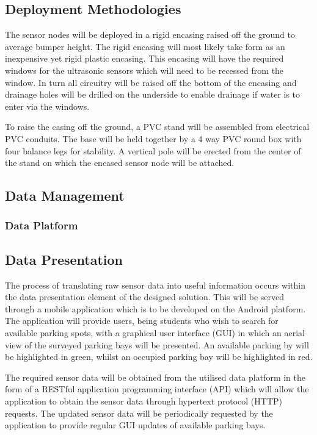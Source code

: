 \documentclass[10pt,twocolumn]{witseiepaper}
\begin{document}
	\subsection{Deployment Methodologies}
		The sensor nodes will be deployed in a rigid encasing raised off the ground to average bumper height. The rigid encasing will most likely take form as an inexpensive yet rigid plastic encasing. This encasing will have the required windows for the ultrasonic sensors which will need to be recessed from the window. In turn all circuitry will be raised off the bottom of the encasing and drainage holes will be drilled on the underside to enable drainage if water is to enter via the windows.
		
		To raise the casing off the ground, a PVC stand will be assembled from electrical PVC conduits. The base will be held together by a 4 way PVC round box with four balance legs for stability. A vertical pole will be erected from the center of the stand on which the encased sensor node will be attached.
	
	\subsection{Data Management}

	\subsubsection{Data Platform}

	\subsection{Data Presentation}
		The process of translating raw sensor data into useful information occurs within the data presentation element of the designed solution. This will be served through a mobile application which is to be developed on the Android platform. The application will provide users, being students who wish to search for available parking spots, with a graphical user interface (GUI) in which an aerial view of the surveyed parking bays will be presented. An available parking by will be highlighted in green, whilst an occupied parking bay will be highlighted in red.

		The required sensor data will be obtained from the utilised data platform in the form of a RESTful application programming interface (API) which will allow the application to obtain the sensor data through hypertext protocol (HTTP) requests. The updated sensor data will be periodically requested by the application to provide regular GUI updates of available parking bays.
	
\end{document}
